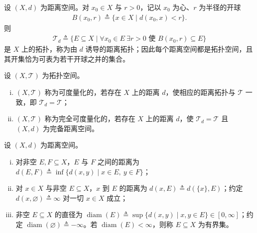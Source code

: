 \documentclass[../main.tex]{subfiles}
\begin{document}
\begin{definition}[距离拓扑]\label{definition:appA-距离拓扑}
设 $(X,d)$ 为距离空间。对 $x_0\in X$ 与 $r>0$，记以 $x_0$ 为心、$r$ 为半径的开球
\begin{align*}
B(x_0,r)\triangleq\{x\in X\mid d(x_0,x)<r\}.
\end{align*}
则
\begin{align*}
\mathscr{T}_d\triangleq\{E\subseteq X\mid \forall x_0\in E\ \exists r>0\text{ 使 }B(x_0,r)\subseteq E\}
\end{align*}
是 $X$ 上的拓扑，称为由 $d$ 诱导的距离拓扑；因此每个距离空间都是拓扑空间，且其开集恰为可表为若干开球之并的集合。
\end{definition}

\begin{definition}[可度量化与完全可度量化]\label{definition:appA-可度量化}
设 $(X,\mathscr{T})$ 为拓扑空间。
\begin{enumerate}[(i)]
\item $(X,\mathscr{T})$ 称为可度量化的，若存在 $X$ 上的距离 $d$，使相应的距离拓扑与 $\mathscr{T}$ 一致，即 $\mathscr{T}_d=\mathscr{T}$；
\item $(X,\mathscr{T})$ 称为完全可度量化的，若存在 $X$ 上的距离 $d$，使 $\mathscr{T}_d=\mathscr{T}$ 且 $(X,d)$ 为完备距离空间。
\end{enumerate}
\end{definition}

\begin{definition}\label{definition:appA-距离直径}
设 $(X,d)$ 为距离空间。
\begin{enumerate}[(i)]
\item 对非空 $E,F\subseteq X$，$E$ 与 $F$ 之间的距离为 $d(E,F)\triangleq\inf\{d(x,y)\mid x\in E,\ y\in F\}$；
\item 对 $x\in X$ 与非空 $E\subseteq X$，$x$ 到 $E$ 的距离为 $d(x,E)\triangleq d(\{x\},E)$；约定 $d(x,\varnothing)\triangleq\infty$ 对一切 $x\in X$ 成立；
\item 非空 $E\subseteq X$ 的直径为 $\operatorname{diam}(E)\triangleq\sup\{d(x,y)\mid x,y\in E\}\in[0,\infty]$；约定 $\operatorname{diam}(\varnothing)\triangleq-\infty$。若 $\operatorname{diam}(E)<\infty$，则称 $E\subseteq X$ 为有界集。
\end{enumerate}
\end{definition}
\end{document}
